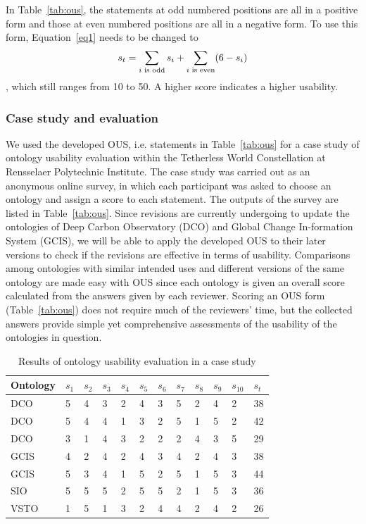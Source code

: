 In Table~\ref{tab:ous}, the statements at odd numbered positions
are all in a positive form and those at even
numbered positions are all in a negative form. To use
this form, Equation~\ref{eq1} needs to be changed to
\begin{equation}
\label{eq2}
s_t = \sum_{i \textrm{ \scriptsize is odd}}s_i+\sum_{i \textrm{ \scriptsize is even}}(6-s_i)
\end{equation}
, which still ranges from 10 to 50. A higher score
indicates a higher usability.
\subsubsection{Case study and evaluation}
We used the developed OUS, i.e. statements in
Table~\ref{tab:ous} for a case study of ontology usability evaluation
within the Tetherless World Constellation at
Rensselaer Polytechnic Institute. The case study was
carried out as an anonymous online survey, in which
each participant was asked to choose an ontology and
assign a score to each statement. The outputs of the
survey are listed in Table~\ref{tab:ous}. Since revisions are currently
undergoing to update the ontologies of Deep Carbon Observatory (DCO) and Global Change In-formation System (GCIS), we will be able to apply the developed OUS to their later versions to check if the revisions are effective in terms of usability. Comparisons among ontologies with similar intended uses and different versions of the same ontology are made easy with OUS since each ontology is given an overall score calculated from the answers given by each reviewer. Scoring an OUS form (Table~\ref{tab:ous}) does not require much of the reviewers' time, but the collected answers provide simple yet comprehensive assessments of the usability of the ontologies in question.
\begin{table}
	\centering
	\caption{Results of ontology usability evaluation in a case study}
	\label{tab:ous-case}
	\begin{tabular}{|l|l|l|l|l|l|l|l|l|l|l|l|}
		\hline Ontology & $s_1$ & $s_2$ & $s_3$ & $s_4$ & $s_5$ & $s_6$ & $s_7$ & $s_8$ & $s_9$ & $s_{10}$ & $s_t$ \\ 
		\hline DCO & 5 & 4 & 3 & 2 & 4 & 3 & 5 & 2 & 4 & 2 & 38 \\ 
		\hline DCO & 5 & 4 & 4 & 1 & 3 & 2 & 5 & 1 & 5 & 2 & 42 \\ 
		\hline DCO & 3 & 1 & 4 & 3 & 2 & 2 & 2 & 4 & 3 & 5 & 29 \\ 
		\hline GCIS & 4 & 2 & 4 & 2 & 4 & 3 & 4 & 2 & 4 & 3 & 38 \\ 
		\hline GCIS & 5 & 3 & 4 & 1 & 5 & 2 & 5 & 1 & 5 & 3 & 44 \\ 
		\hline SIO & 5 & 5 & 5 & 2 & 5 & 5 & 2 & 1 & 5 & 3 & 36 \\ 
		\hline VSTO & 1 & 5 & 1 & 3 & 2 & 4 & 4 & 2 & 4 & 2 & 26 \\ 
		\hline 
	\end{tabular} 
\end{table}

